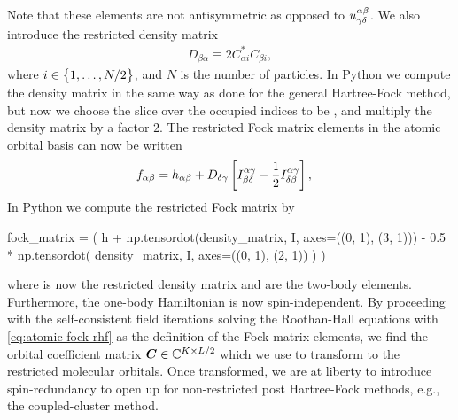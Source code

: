             Note that these elements are not antisymmetric as opposed to
            $u^{\alpha\beta}_{\gamma\delta}$.
            We also introduce the restricted density matrix
            \begin{align}
                D_{\beta \alpha}
                \equiv 2 C^{*}_{\alpha i} C_{\beta i},
            \end{align}
            where $i \in \left\{ 1, \dots, N / 2 \right\}$, and $N$ is the number of
            particles.
            In Python we compute the density matrix in the same way as done for
            the general Hartree-Fock method, but now we choose the slice over
            the occupied indices to be , and multiply
            the density matrix by a factor $2$.
            The restricted Fock matrix elements in the atomic orbital basis can
            now be written
            \begin{align}
                f_{\alpha\beta}
                &=
                h_{\alpha\beta}
                + D_{\delta\gamma}
                \left[ 
                    I^{\alpha\gamma}_{\beta\delta}
                    -
                    \frac{1}{2}
                    I^{\alpha\gamma}_{\delta\beta}
                 \right],
                \label{eq:atomic-fock-rhf}
            \end{align}
            In Python we compute the restricted Fock matrix by
            \begin{python}
fock_matrix = (
    h
    + np.tensordot(density_matrix, I, axes=((0, 1), (3, 1)))
    - 0.5 * np.tensordot(
        density_matrix, I, axes=((0, 1), (2, 1))
    )
)
            \end{python}
            where  is now the restricted density matrix and
             are the two-body elements.
            Furthermore, the one-body Hamiltonian  is now
            spin-independent.
            By proceeding with the self-consistent field iterations solving the
            Roothan-Hall equations with \autoref{eq:atomic-fock-rhf} as the
            definition of the Fock matrix elements, we find the orbital
            coefficient matrix $\boldsymbol{C} \in \mathbb{C}^{K \times L/2}$ which we
            use to transform to the restricted molecular orbitals.
            Once transformed, we are at liberty to introduce spin-redundancy to
            open up for non-restricted post Hartree-Fock methods, e.g., the
            coupled-cluster method.

